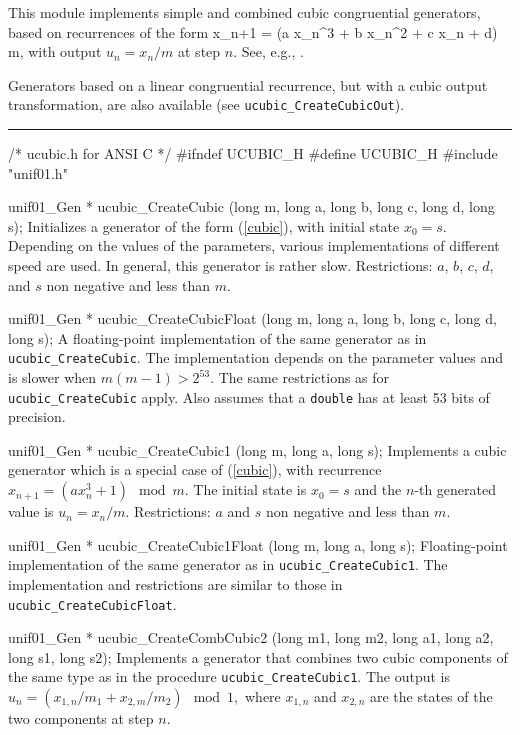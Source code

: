 
This module implements simple and combined cubic congruential 
generators, based on recurrences of the form
\eq
  x_{n+1} = (a x_n^3 + b x_n^2 + c x_n + d) \mod m,   
\endeq
with output $u_n = x_n/m$ at step $n$.
See, e.g., \cite{rEIC97a,rLEC98h}.

Generators based on a linear congruential recurrence, but with
a cubic output transformation, are also available
(see {\tt ucubic\_CreateCubicOut}).


\bigskip
\hrule
\code
\hide
/* ucubic.h for ANSI C */
#ifndef UCUBIC_H
#define UCUBIC_H
\endhide
#include "unif01.h"


unif01_Gen * ucubic_CreateCubic (long m, long a, long b, long c, long d,
                                 long s);
\endcode
  \tab  Initializes a generator of the form (\ref{cubic}), with
   initial state $x_0 = s$.
%
   Depending on the values of the parameters, various implementations 
   of different speed are used. 
   In general, this generator is rather slow.  
   Restrictions: $a$, $b$, $c$, $d$, and $s$ non
   negative and less than $m$.
 \endtab
\code


unif01_Gen * ucubic_CreateCubicFloat (long m, long a, long b, long c,
                                      long d, long s);
\endcode
  \tab A floating-point implementation of the same generator as in
   {\tt ucubic\_CreateCubic}.
   The implementation depends on the parameter values and is slower
   when $m(m-1) > 2^{53}$. 
   The same restrictions as for {\tt ucubic\_CreateCubic} apply.
   Also assumes that a {\tt double} has at least 53 bits of precision.
 \endtab
\code


unif01_Gen * ucubic_CreateCubic1 (long m, long a, long s);
\endcode
  \tab  Implements a cubic generator which is a special case of  
   (\ref{cubic}), with recurrence  $x_{n+1} = (a x_n^3 + 1) \mod m$.
   The  initial state is $x_0 = s$ and the $n$-th generated value 
   is $u_n = x_n/m$.
   Restrictions: $a$ and $s$ non negative and less than  $m$.
 \endtab
\code


unif01_Gen * ucubic_CreateCubic1Float (long m, long a, long s);
\endcode
  \tab Floating-point implementation of the same generator as in
  {\tt ucubic\_CreateCubic1}.  The implementation and restrictions are 
  similar to those in {\tt ucubic\_CreateCubicFloat}.
 \endtab
\code


unif01_Gen * ucubic_CreateCombCubic2 (long m1, long m2, long a1, long a2, 
                                      long s1, long s2);
\endcode
  \tab  Implements a generator that combines two cubic components
   of the same type as in the procedure {\tt ucubic\_CreateCubic1}.
  The output is
    $ u_n = (x_{1,n}/m_1 + x_{2,m}/m_2)  \mod 1, $
   where $x_{1,n}$ and $x_{2,n}$ are the states of the two components
   at step $n$.
 \endtab
\code


